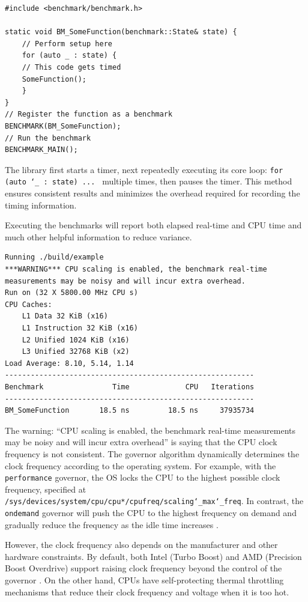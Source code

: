 \documentclass[logo,bsc,singlespacing,parskip]{infthesis}
\begin{document}
\begin{verbatim}
#include <benchmark/benchmark.h>

static void BM_SomeFunction(benchmark::State& state) {
    // Perform setup here
    for (auto _ : state) {
    // This code gets timed
    SomeFunction();
    }
}
// Register the function as a benchmark
BENCHMARK(BM_SomeFunction);
// Run the benchmark
BENCHMARK_MAIN();
\end{verbatim}

The library first starts a timer, next repeatedly executing its core loop: \linebreak \texttt{for (auto \char`_ : state) ... } multiple times, then pauses the timer. This method ensures consistent results and minimizes the overhead required for recording the timing information. 

Executing the benchmarks will report both elapsed real-time and CPU time and much other helpful information to reduce variance. 

\begin{verbatim}
Running ./build/example
***WARNING*** CPU scaling is enabled, the benchmark real-time 
measurements may be noisy and will incur extra overhead.
Run on (32 X 5800.00 MHz CPU s)
CPU Caches:
    L1 Data 32 KiB (x16)
    L1 Instruction 32 KiB (x16)
    L2 Unified 1024 KiB (x16)
    L3 Unified 32768 KiB (x2)
Load Average: 8.10, 5.14, 1.14
----------------------------------------------------------
Benchmark                Time             CPU   Iterations
----------------------------------------------------------
BM_SomeFunction       18.5 ns         18.5 ns     37935734
\end{verbatim}

The warning: ``CPU scaling is enabled, the benchmark real-time measurements may be noisy and will incur extra overhead'' is saying that the CPU clock frequency is not consistent. The governor algorithm dynamically determines the clock frequency according to the operating system. For example, with the \texttt{performance} governor, the OS locks the CPU to the highest possible clock frequency, specified at \texttt{/sys/devices/system/cpu/cpu*/cpufreq/scaling\char`_max\char`_freq}. In contrast, the \texttt{ondemand} governor will push the CPU to the highest frequency on demand and gradually reduce the frequency as the idle time increases \cite{archLinuxFreqScal}.

However, the clock frequency also depends on the manufacturer and other hardware constraints. By default, both Intel (Turbo Boost) and AMD (Precision Boost Overdrive) support raising clock frequency beyond the control of the governor \cite{GoogleBenchReduceVariance}. On the other hand, CPUs have self-protecting thermal throttling mechanisms that reduce their clock frequency and voltage when it is too hot. 
\end{document}
